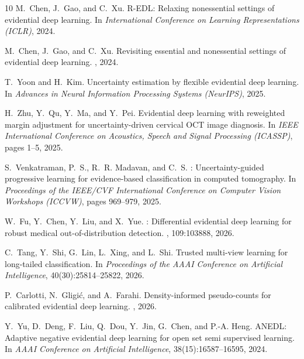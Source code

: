 \documentclass[letterpaper]{article}
\begin{document}
\begin{thebibliography}{10}
M.~Chen, J.~Gao, and C.~Xu.
\newblock R-EDL: Relaxing nonessential settings of evidential deep learning.
\newblock In {\em International Conference on Learning Representations (ICLR)}, 2024.

M.~Chen, J.~Gao, and C.~Xu.
\newblock Revisiting essential and nonessential settings of evidential deep learning.
, 2024.

T.~Yoon and H.~Kim.
\newblock Uncertainty estimation by flexible evidential deep learning.
\newblock In {\em Advances in Neural Information Processing Systems (NeurIPS)}, 2025.

H.~Zhu, Y.~Qu, Y.~Ma, and Y.~Pei.
\newblock Evidential deep learning with reweighted margin adjustment for uncertainty-driven cervical {OCT} image diagnosis.
\newblock In {\em IEEE International Conference on Acoustics, Speech and Signal Processing (ICASSP)}, pages 1--5, 2025.

S.~Venkatraman, P.~S., R.~R. Madavan, and C.~S.
: Uncertainty-guided progressive learning for evidence-based classification in computed tomography.
\newblock In {\em Proceedings of the IEEE/CVF International Conference on Computer Vision Workshops (ICCVW)}, pages 969--979, 2025.

W.~Fu, Y.~Chen, Y.~Liu, and X.~Yue.
: Differential evidential deep learning for robust medical out-of-distribution detection.
, 109:103888, 2026.

C.~Tang, Y.~Shi, G.~Lin, L.~Xing, and L.~Shi.
\newblock Trusted multi-view learning for long-tailed classification.
\newblock In {\em Proceedings of the AAAI Conference on Artificial Intelligence}, 40(30):25814--25822, 2026.

P.~Carlotti, N.~Gligi\'c, and A.~Farahi.
\newblock Density-informed pseudo-counts for calibrated evidential deep learning.
, 2026.

Y.~Yu, D.~Deng, F.~Liu, Q.~Dou, Y.~Jin, G.~Chen, and P.-A. Heng.
\newblock ANEDL: Adaptive negative evidential deep learning for open set semi supervised learning.
\newblock In {\em AAAI Conference on Artificial Intelligence}, 38(15):16587--16595, 2024.


\end{thebibliography}
\end{document}
